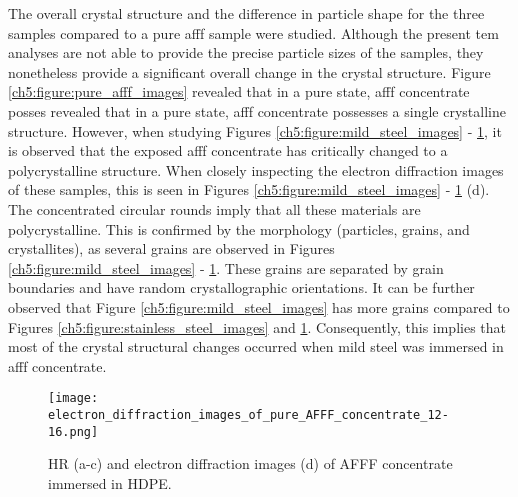 The overall crystal structure and the difference in particle shape for the three samples compared to a pure \acrshort{afff} sample were studied. Although the present \acrshort{tem} analyses are not able to provide the precise particle sizes of the samples, they nonetheless provide a significant overall change in the crystal structure. Figure \ref{ch5:figure:pure_afff_images} revealed that in a pure state, \acrshort{afff} concentrate posses revealed that in a pure state, \acrshort{afff} concentrate possesses a single crystalline structure. However, when studying Figures \ref{ch5:figure:mild_steel_images} - \ref{ch5:figure:hdpe_images}, it is observed that the exposed \acrshort{afff} concentrate has critically changed to a polycrystalline structure. When closely inspecting the electron diffraction images of these samples, this is seen in Figures \ref{ch5:figure:mild_steel_images} - \ref{ch5:figure:hdpe_images} (d). The concentrated circular rounds imply that all these materials are polycrystalline. This is confirmed by the morphology (particles, grains, and crystallites), as several grains are observed in Figures \ref{ch5:figure:mild_steel_images} - \ref{ch5:figure:hdpe_images}. These grains are separated by grain boundaries and have random crystallographic orientations. It can be further observed that Figure \ref{ch5:figure:mild_steel_images} has more grains compared to Figures \ref{ch5:figure:stainless_steel_images} and \ref{ch5:figure:hdpe_images}. Consequently, this implies that most of the crystal structural changes occurred when mild steel was immersed in \acrshort{afff} concentrate.

\begin{figure}[H]
\centering

\texttt{[image: electron\_diffraction\_images\_of\_pure\_AFFF\_concentrate\_12-16.png]}

\caption{HR (a-c) and electron diffraction images (d) of AFFF concentrate immersed in HDPE.}
\label{ch5:figure:hdpe_images}
\end{figure}


